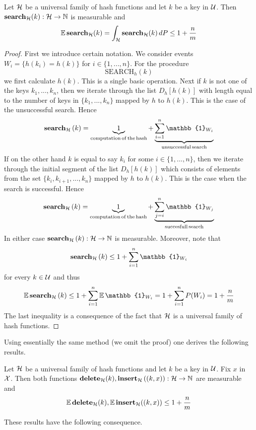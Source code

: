 \begin{theorem}\label{theorem:universal_family_of_hash_functions_expected_cost_for_search}
Let ${\mathcal H}$ be a universal family of hash functions and let $k$ be a key in ${\mathcal U}$. Then $\mathbf{search}_{\mathcal H}(k):{\mathcal H}\rightarrow {\mathbb N}$ is measurable and
$$\mathbb{E}\,\mathbf{search}_{\mathcal H}(k) = \int_{{\mathcal H}}\mathbf{search}_{\mathcal H}(k)\,dP \leq 1 + \frac{n}{m}$$
\end{theorem}
\begin{proof}
First we introduce certain notation. We consider events $W_{i} = \big\{h(k_i) = h(k)\big\}$ for $i\in \{1,...,n\}$. For the procedure
$$\mathrm{SEARCH}_h(k)$$
we first calculate $h(k)$. This is a single basic operation. Next if $k$ is not one of the keys $k_1,...,k_n$, then we iterate through the list $D_h[h(k)]$ with length equal to the number of keys in $\big\{k_1,...,k_n\big\}$ mapped by $h$ to $h(k)$. This is the case of the unsuccessful search. Hence
$$\bd{search}_\cH\left(k\right) = \underbrace{1}_{\mathrm{computation\,of\,the\,hash}} + \underbrace{\sum_{i=1}^n \mathbb{1}_{W_{i}}}_{\mathrm{unsuccessful\,search}}$$
If on the other hand $k$ is equal to say $k_i$ for some $i\in \{1,...,n\}$, then we iterate through the initial segment of the list $D_h[h(k)]$ which consists of elements from the set $\big\{k_i,k_{i+1},...,k_n\big\}$ mapped by $h$ to $h(k)$. This is the case when the search is successful. Hence
$$\bd{search}_\cH\left(k\right) = \underbrace{1}_{\mathrm{computation\,of\,the\,hash}} + \underbrace{\sum_{j = i}^n \mathbb{1}_{W_{j}}}_{\mathrm{succesfull\,search}}$$
In either case $\mathbf{search}_{\mathcal H}\left(k\right):{\mathcal H}\rightarrow {\mathbb N}$ is measurable. Moreover, note that
$$\bd{search}_{\cH}\left(k\right) \leq 1 + \sum_{i=1}^n \mathbb{1}_{W_{i}}$$
for every $k\in {\mathcal U}$ and thus
$$\mathbb{E}\,\bd{search}_\cH\left(k\right) \leq 1 +  \sum_{i=1}^n \mathbb{E}\,\mathbb{1}_{W_{i}} = 1 + \sum_{i=1}^nP(W_i) =  1 + \frac{n}{m}$$
The last inequality is a consequence of the fact that ${\mathcal H}$ is a universal family of hash functions.
\end{proof}
\noindent
Using essentially the same method (we omit the proof) one derives the following results.

\begin{theorem}\label{theorem:universal_family_of_hash_functions_expected_costs_of_delete_and_insert}
Let ${\mathcal H}$ be a universal family of hash functions and let $k$ be a key in ${\mathcal U}$. Fix $x$ in ${\mathcal X}$. Then both functions $\mathbf{delete}_{\mathcal H}(k),\mathbf{insert}_{\mathcal H}\left((k,x)\right):{\mathcal H}\rightarrow {\mathbb N}$ are measurable and
$$\mathbb{E}\,\mathbf{delete}_{\mathcal H}(k), \mathbb{E}\,\mathbf{insert}_{\mathcal H}((k,x))  \leq 1 + \frac{n}{m}$$
\end{theorem}
\noindent
These results have the following consequence.

